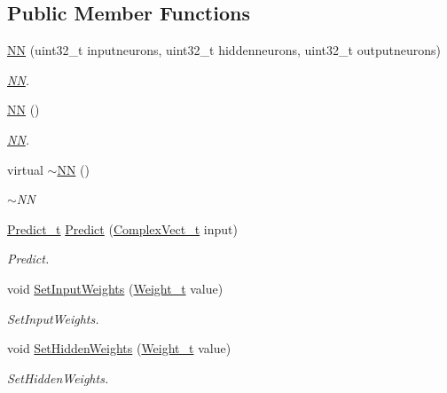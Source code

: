 \subsection*{Public Member Functions}
\begin{DoxyCompactItemize}
\item 
\hyperlink{class_soil_math_1_1_n_n_a46efd1eb7e31be2818c9858b640fcb5b}{N\+N} (uint32\+\_\+t inputneurons, uint32\+\_\+t hiddenneurons, uint32\+\_\+t outputneurons)
\begin{DoxyCompactList}\small\item\em \hyperlink{class_soil_math_1_1_n_n}{N\+N}. \end{DoxyCompactList}\item 
\hyperlink{class_soil_math_1_1_n_n_a778606ea8a193479da233a030d1df234}{N\+N} ()
\begin{DoxyCompactList}\small\item\em \hyperlink{class_soil_math_1_1_n_n}{N\+N}. \end{DoxyCompactList}\item 
virtual \hyperlink{class_soil_math_1_1_n_n_a37cb0ebe3576af3cf47c2e6330e1b34a}{$\sim$\+N\+N} ()
\begin{DoxyCompactList}\small\item\em $\sim$\+N\+N \end{DoxyCompactList}\item 
\hyperlink{_soil_math_types_8h_aaeba766195a440b2539f0438d3d41f95}{Predict\+\_\+t} \hyperlink{class_soil_math_1_1_n_n_aa7f23fcdb8383a74586c9c30b8bc0af7}{Predict} (\hyperlink{_soil_math_types_8h_a7567e521c2b2c408dcb62dbff72390f7}{Complex\+Vect\+\_\+t} input)
\begin{DoxyCompactList}\small\item\em Predict. \end{DoxyCompactList}\item 
void \hyperlink{class_soil_math_1_1_n_n_a411371d8297e9d1ff10c919d1293d80e}{Set\+Input\+Weights} (\hyperlink{_soil_math_types_8h_ac56ad2b88186620fd0de0d213aa715dd}{Weight\+\_\+t} value)
\begin{DoxyCompactList}\small\item\em Set\+Input\+Weights. \end{DoxyCompactList}\item 
void \hyperlink{class_soil_math_1_1_n_n_a8465f4fd2aebe181601c4be31df47ffd}{Set\+Hidden\+Weights} (\hyperlink{_soil_math_types_8h_ac56ad2b88186620fd0de0d213aa715dd}{Weight\+\_\+t} value)
\begin{DoxyCompactList}\small\item\em Set\+Hidden\+Weights. \end{DoxyCompactList}\item 

\end{DoxyCompactItemize}
